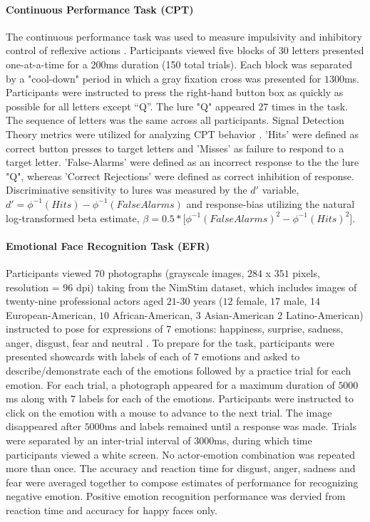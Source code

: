 \documentclass[utf8]{frontiersSCNS} %
\begin{document}
\paragraph{Continuous Performance Task (CPT)} The continuous performance task was used to measure impulsivity and inhibitory control of reflexive actions \citep{horn2003response}.  Participants viewed five blocks of $30$ letters presented one-at-a-time for a $200$ms duration (150 total trials). Each block was separated by a "cool-down" period in which a gray fixation cross was presented for $1300$ms. Participants were instructed to press the right-hand button box as quickly as possible for all letters except “Q”. The lure "Q" appeared 27 times in the task. The sequence of letters was the same across all participants.  Signal Detection Theory metrics were utilized for analyzing CPT behavior \cite{stanislaw1999calculation}. 'Hits' were defined as correct button presses to target letters and 'Misses' as failure to respond to a target letter. 'False-Alarms' were defined as an incorrect response to the the lure "Q", whereas 'Correct Rejections' were defined as correct inhibition of response. Discriminative sensitivity to lures was measured by the $d'$ variable, $d'=\phi^{-1}( Hits ) - \phi^{-1}( False Alarms )$ and response-bias utilizing the natural log-transformed beta estimate, $ \beta = 0.5*\Big[\phi^{-1}(FalseAlarms)^{2} - \phi^{-1}(Hits)^{2}\Big]$. 
\paragraph{Emotional Face Recognition Task (EFR)} Participants viewed $70$ photographs (grayscale images, $284$ x $351$ pixels, resolution = $96$ dpi) taking from the NimStim dataset, which includes images of twenty-nine professional actors aged $21$-$30$ years ($12$ female, $17$ male, $14$ European-American, $10$ African-American, $3$ Asian-American $2$ Latino-American) instructed to pose for expressions of $7$ emotions: happiness, surprise, sadness, anger, disgust, fear and neutral \citep{tottenham2009nimstim}. To prepare for the task, participants were presented showcards with labels of each of $7$ emotions and asked to describe/demonstrate each of the emotions followed by a practice trial for each emotion. For each trial, a photograph appeared for a maximum duration of $5000$ms along with $7$ labels for each of the emotions. Participants were instructed to click on the emotion with a mouse to advance to the next trial. The image disappeared after $5000$ms and labels remained until a response was made. Trials were separated by an inter-trial interval of $3000$ms, during which time participants viewed a white screen. No actor-emotion combination was repeated more than once. The accuracy and reaction time for disgust, anger, sadness and fear were averaged together to compose estimates of performance for recognizing negative emotion. Positive emotion recognition performance was dervied from reaction time and accuracy for happy faces only. 
\end{document}
